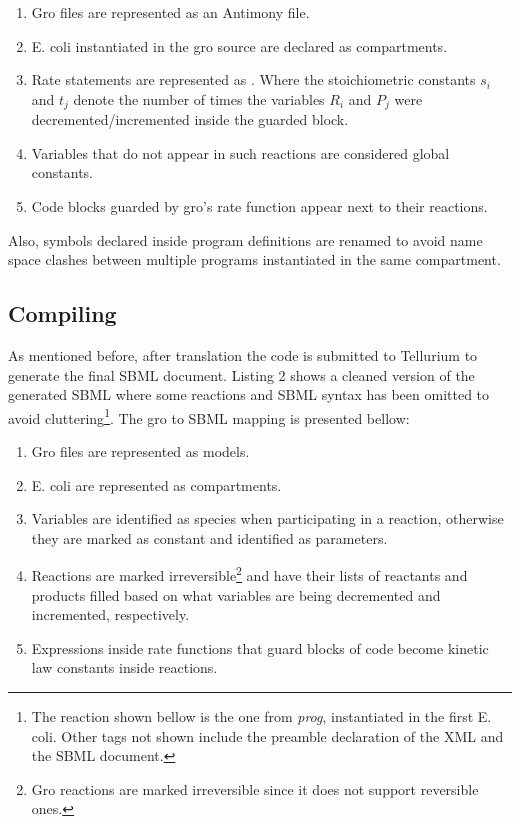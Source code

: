 \documentclass[12pt]{article}
\begin{document}
    \begin{enumerate}[label=(\roman*)]
        \item Gro files are represented as an Antimony file.
        \item E. coli instantiated in the gro source are declared as compartments.
        \item Rate statements are represented as . Where the stoichiometric constants $s_{i}$ and $t_{j}$ denote the number of times the variables  $R_{i}$ and $P_{j}$ were decremented/incremented inside the guarded block.
        \item Variables that do not appear in such reactions are considered global constants.
        \item Code blocks guarded by gro's rate function appear next to their reactions.
    \end{enumerate}
    
    Also, symbols declared inside program definitions are renamed to avoid name space clashes between multiple programs instantiated in the same compartment.
    
\subsection{Compiling}

    As mentioned before, after translation the code is submitted to Tellurium to generate the final SBML document. Listing 2 shows a cleaned version of the generated SBML where some reactions and SBML syntax has been omitted to avoid cluttering\footnote{The reaction shown bellow is the one from \textit{prog}, instantiated in the first E. coli. Other tags not shown include the preamble declaration of the XML and the SBML document.}. The gro to SBML mapping is presented bellow:
    
    \begin{enumerate}[label=(\roman*)]
        \item Gro files are represented as models.
        \item E. coli are represented as compartments.
        \item Variables are identified as species when participating in a reaction, otherwise they are marked as constant and identified as parameters.
        \item Reactions are marked irreversible\footnote{Gro reactions are marked irreversible since it does not support reversible ones.} and have their lists of reactants and products filled based on what variables are being decremented and incremented, respectively.
        \item Expressions inside rate functions that guard blocks of code become kinetic law constants inside reactions.
    \end{enumerate}
    
\end{document}

